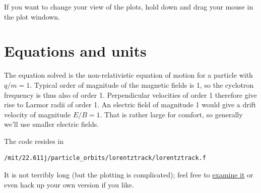 \documentclass[12pt]{article}
\begin{document}
If you want to change your view of the plots, hold down and drag your
mouse in the plot windown. 

\section{Equations and units}

The equation solved is the non-relativistic equation of motion for a
particle with $q/m = 1$. Typical order of magnitude of the magnetic
fields is 1, so the cyclotron frequency is thus also of order 1.
Perpendicular velocities of order 1 therefore give rise to Larmor
radii of order 1. An electric field of magnitude 1 would give a drift
velocity of magnitude $E/B = 1$. That is rather large for comfort, so
generally we'll use smaller electric fields.

The code resides in
\begin{verbatim}
/mit/22.611j/particle_orbits/lorentztrack/lorentztrack.f
\end{verbatim}
It is not terribly long (but the plotting is complicated); feel free to
\href{lorentztrack.f}{examine it} or even hack up your own version if
you like.
\end{document}
